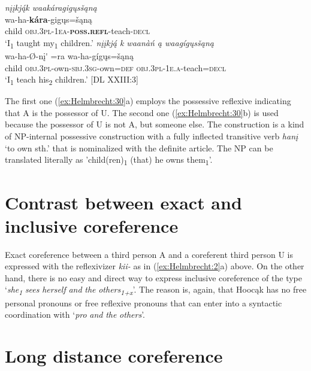 \documentclass[output=paper]{langscibook}
\begin{document}
\ea \label{ex:Helmbrecht:30}
  \ea \textit{nįįkją́k waakáragigųsšąną}\\ 
     {wa-ha-\textbf{kára}-gigųs=šąną}\\
 {child} {\textsc{obj.3\textsc{pl}-1\textsc{ea}-\textbf{\textsc{poss}.\textsc{refl}}}-teach-\textsc{decl}}\\
   \glt `I\textsubscript{1} taught my\textsubscript{1} children.'
  \ex  \textit{nįįkją́ k waanàń ą waagígųsšąną}\\
   {wa-ha-Ø{}-nį\'{} =ra}   {wa-ha-gígųs=šąną}\\ 
 {child}  {\textsc{obj.3pl}-own-\textsc{sbj.3sg}-own=\textsc{def}}  {\textsc{obj.3pl-1e.a}-teach=\textsc{decl}}\\
  \glt `I\textsubscript{1} teach his\textsubscript{2} children.' [DL XXIII:3]
  \z 
\z 

The first one (\ref{ex:Helmbrecht:30}a) employs the possessive reflexive indicating that A is the possessor of U. The second one (\ref{ex:Helmbrecht:30}b) is used because the possessor of U is not A, but someone else. The construction is a kind of NP-internal possessive construction with a fully inflected transitive verb \textit{hanį} `to own sth.' that is nominalized with the definite article. The NP can be translated literally as 'child(ren)\textsubscript{1} (that) he owns them\textsubscript{1}'. 

\section{Contrast between exact and inclusive coreference}\label{sec:Helmbrecht:8}

Exact coreference between a third person A and a coreferent third person U is expressed with the reflexivizer \textit{kii-} as in (\ref{ex:Helmbrecht:2}a) above. On the other hand, there is no easy and direct way to express inclusive coreference of the type `\textit{she\textsubscript{1}} \textit{sees} \textit{herself} \textit{and} \textit{the} \textit{others\textsubscript{1+x}}{}'. The reason is, again, that Hoocąk has no free personal pronouns or free reflexive pronouns that can enter into a syntactic coordination with `\textit{pro} \textit{and} \textit{the} \textit{others}{}'. 

\section{Long distance coreference}\label{sec:Helmbrecht:9}
\end{document}
